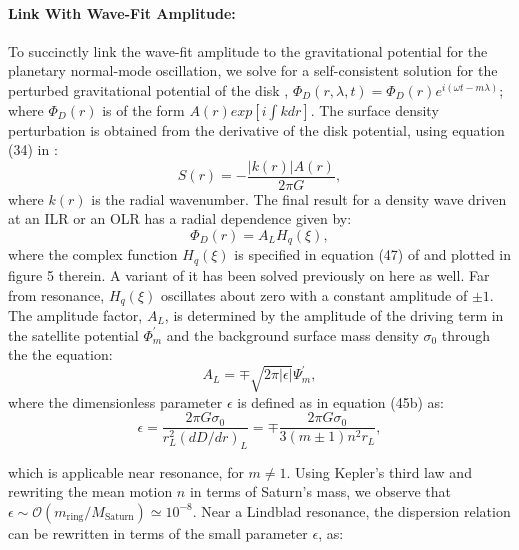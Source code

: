 \documentclass{article}
\begin{document}
\paragraph{Link With Wave-Fit Amplitude:}

\vspace{3pt}

To succinctly link the wave-fit amplitude to the gravitational potential for the planetary normal-mode oscillation, we solve for a self-consistent solution for the perturbed gravitational potential of the disk \cite{1984prin.conf..513S}, $\Phi_{D}(r,\lambda,t) = \Phi_{D}(r)e^{i(\omega t - m \lambda)}$; where $\Phi_{D}(r)$ is of the form $A(r)exp[i\int k dr]$. The surface density perturbation is obtained from the derivative of the disk potential, using equation (34) in \cite{1984prin.conf..513S}:
\begin{equation}
    S(r) = - \frac{|k(r)|A(r)}{2\pi G},
\end{equation}
where $k(r)$ is the radial wavenumber. The final result for a density wave driven at an ILR or an OLR has a radial dependence given by:
\begin{equation}
    \Phi_{D}(r) = A_{L}H_{q}(\xi),
\end{equation}
where the complex function $H_{q}(\xi)$ is specified in equation (47) of \cite{1984prin.conf..513S} and plotted in figure 5 therein. A variant of it has been solved previously on here as well. Far from resonance, $H_{q}(\xi)$ oscillates about zero with a constant amplitude of $\pm1$. The amplitude factor, $A_{L}$, is determined by the amplitude of the driving term in the satellite potential $\Phi_{m}^{'}$ and the background surface mass density $\sigma_{0}$ through the the equation:
\begin{equation}
    A_{L} = \mp\sqrt{2\pi|\epsilon|}\Psi_{m}^{'},
\end{equation}
where the dimensionless parameter $\epsilon$ is defined as in \cite{1984prin.conf..513S} equation (45b) as:
\begin{equation}
    \epsilon = \frac{2\pi G \sigma_{0}}{r_{L}^{2}(dD/dr)_{L}} = \mp \frac{2\pi G \sigma_{0}}{3(m\pm1)n^{2}r_{L}},
\end{equation}

which is applicable near resonance, for $m \neq 1$. Using Kepler's third law and rewriting the mean motion $n$ in terms of Saturn's mass, we observe that $\epsilon \sim \mathcal{O} \left({m_{\text{ring}}}/{M_{\text{Saturn}}}\right) \simeq 10^{-8}$. Near a Lindblad resonance, the dispersion relation can be rewritten in terms of the small parameter $\epsilon$, as:
\end{document}
